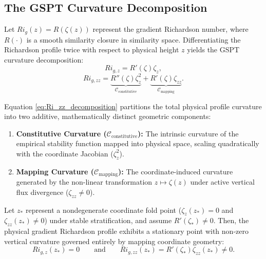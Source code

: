 \subsection{The GSPT Curvature Decomposition}

Let $Ri_g(z) = R(\zeta(z))$ represent the gradient Richardson number, where $R(\cdot)$ is a smooth similarity closure in similarity space. Differentiating the Richardson profile twice with respect to physical height $z$ yields the GSPT curvature decomposition:
\begin{equation}
    Ri_{g,z} = R'(\zeta) \zeta_z, \label{eq:Ri_z_chain}
\end{equation}
\begin{equation}
    Ri_{g,zz} = \underbrace{R''(\zeta) \zeta_z^2}_{\mathcal{C}_{\text{constitutive}}} + \underbrace{R'(\zeta) \zeta_{zz}}_{\mathcal{C}_{\text{mapping}}}. \label{eq:Ri_zz_decomposition}
\end{equation}

Equation \eqref{eq:Ri_zz_decomposition} partitions the total physical profile curvature into two additive, mathematically distinct geometric components:
\begin{enumerate}
    \item \textbf{Constitutive Curvature ($\mathcal{C}_{\text{constitutive}}$):} The intrinsic curvature of the empirical stability function mapped into physical space, scaling quadratically with the coordinate Jacobian ($\zeta_z^2$).
    \item \textbf{Mapping Curvature ($\mathcal{C}_{\text{mapping}}$):} The coordinate-induced curvature generated by the non-linear transformation $z \mapsto \zeta(z)$ under active vertical flux divergence ($\zeta_{zz} \neq 0$).
\end{enumerate}

\begin{theorem}
Let $z_*$ represent a nondegenerate coordinate fold point ($\zeta_z(z_*) = 0$ and $\zeta_{zz}(z_*) \neq 0$) under stable stratification, and assume $R'(\zeta_*) \neq 0$. Then, the physical gradient Richardson profile exhibits a stationary point with non-zero vertical curvature governed entirely by mapping coordinate geometry:
\begin{equation}
    Ri_{g,z}(z_*) = 0 \qquad \text{and} \qquad Ri_{g,zz}(z_*) = R'(\zeta_*) \zeta_{zz}(z_*) \neq 0. \label{eq:fold_curvature_theorem}
\end{equation}
\end{theorem}

